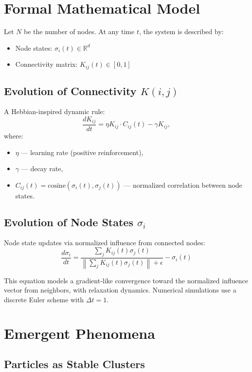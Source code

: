 \documentclass[12pt]{article}
\begin{document}
\section{Formal Mathematical Model}

Let $N$ be the number of nodes. At any time $t$, the system is described by:
\begin{itemize}
    \item Node states: $\sigma_i(t) \in \mathbb{R}^d$
    \item Connectivity matrix: $K_{ij}(t) \in [0,1]$
\end{itemize}

\subsection{Evolution of Connectivity \texorpdfstring{$K(i,j)$}{K(i,j)}}

A Hebbian-inspired dynamic rule:
\[
\frac{dK_{ij}}{dt} = \eta K_{ij} \cdot C_{ij}(t) - \gamma K_{ij},
\]
where:
\begin{itemize}
    \item $\eta$ — learning rate (positive reinforcement),
    \item $\gamma$ — decay rate,
    \item $C_{ij}(t) = \text{cosine}(\sigma_i(t), \sigma_j(t))$ — normalized correlation between node states.
\end{itemize}

\subsection{Evolution of Node States \texorpdfstring{$\sigma_i$}{sigma\_i}}

Node state updates via normalized influence from connected nodes:
\[
\frac{d\sigma_i}{dt} = \frac{\sum\limits_{j} K_{ij}(t) \sigma_j(t)}{\left\| \sum_j K_{ij}(t) \sigma_j(t) \right\| + \epsilon} - \sigma_i(t)
\]

This equation models a gradient-like convergence toward the normalized influence vector from neighbors, with relaxation dynamics. Numerical simulations use a discrete Euler scheme with $\Delta t = 1$.

\section{Emergent Phenomena}

\subsection{Particles as Stable Clusters}
\end{document}

